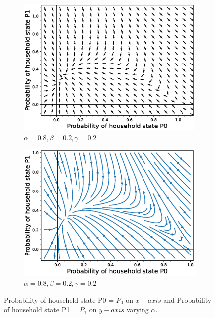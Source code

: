 \documentclass[paper=a4, fontsize=11pt, twoside, BCOR=12mm, parskip=full, listof=totoc]{scrreprt}
\begin{document}
{\begin{figure}[H]
\begin{subfigure}[b]{0.4\linewidth}
	  \includegraphics[width=\linewidth]{phase_portrait/041_g5.eps}
	  \caption{\(\alpha=0.8, \beta=0.2, \gamma=0.2\)}
	  \label{alpha eight phasevectorfield}
	\end{subfigure}
	\begin{subfigure}[b]{0.4\linewidth}
	  \includegraphics[width=\linewidth]{phase_portrait/041_g5s.eps}
	  \caption{\(\alpha=0.8, \beta=0.2, \gamma=0.2\)}
	  \label{alpha eight phasestreamplot}
	\end{subfigure}
	\caption{Probability of household state P0 = $P_0$ on $x-axis$ and Probability of household state P1 = $P_1$ on $y-axis$ varying $\alpha$.}
	\label{plot of vector fields of $P_0$ on x axis and $P_1$ on y axis of alpha}
\end{figure}
}
\end{document}
